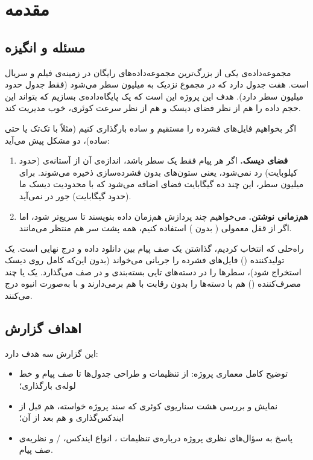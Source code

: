 \section{مقدمه}
\label{sec:intro}

\subsection{مسئله و انگیزه}

مجموعه‌داده‌ی  \cite{imdb, imdbdocs} یکی از بزرگ‌ترین مجموعه‌داده‌های رایگان در زمینه‌ی فیلم و سریال است. هفت جدول دارد که در مجموع نزدیک به  میلیون سطر می‌شود (فقط جدول  حدود  میلیون سطر دارد). هدف این پروژه این است که یک پایگاه‌داده‌ی  بسازیم که بتواند این حجم داده را هم از نظر فضای دیسک و هم از نظر سرعت کوئری، خوب مدیریت کند.

اگر بخواهیم فایل‌های  فشرده را مستقیم و ساده بارگذاری کنیم (مثلاً با  تک‌تک یا حتی  ساده)، دو مشکل پیش می‌آید:

\begin{enumerate}
\item \textbf{فضای دیسک.} اگر هر پیام فقط یک سطر باشد، اندازه‌ی آن از آستانه‌ی  (حدود  کیلوبایت) رد نمی‌شود، یعنی ستون‌های  بدون فشرده‌سازی ذخیره می‌شوند. برای  میلیون سطر، این چند ده گیگابایت فضای اضافه می‌شود که با محدودیت دیسک ما (حدود  گیگابایت) جور در نمی‌آید.
\item \textbf{هم‌زمانی نوشتن.} می‌خواهیم چند پردازش هم‌زمان داده بنویسند تا سریع‌تر شود، اما اگر از قفل معمولی ( بدون ) استفاده کنیم، همه پشت سر هم منتظر می‌مانند.
\end{enumerate}

راه‌حلی که انتخاب کردیم، گذاشتن یک صف پیام بین دانلود داده و درج نهایی است. یک تولیدکننده () فایل‌های فشرده را جریانی می‌خواند (بدون این‌که کامل روی دیسک استخراج شود)، سطرها را در دسته‌های تایی بسته‌بندی و در صف می‌گذارد. یک یا چند مصرف‌کننده () هم با  \cite{pglocking} دسته‌ها را بدون رقابت با هم برمی‌دارند و با  به‌صورت انبوه درج می‌کنند.

\subsection{اهداف گزارش}

این گزارش سه هدف دارد:

\begin{itemize}
\item توضیح کامل معماری پروژه: از تنظیمات  و طراحی جدول‌ها تا صف پیام و خط لوله‌ی بارگذاری؛
\item نمایش و بررسی هشت سناریوی کوئری که سند پروژه خواسته، هم قبل از ایندکس‌گذاری و هم بعد از آن؛
\item پاسخ به سؤال‌های نظری پروژه درباره‌ی تنظیمات ، انواع ایندکس، / و نظریه‌ی صف پیام.
\end{itemize}

